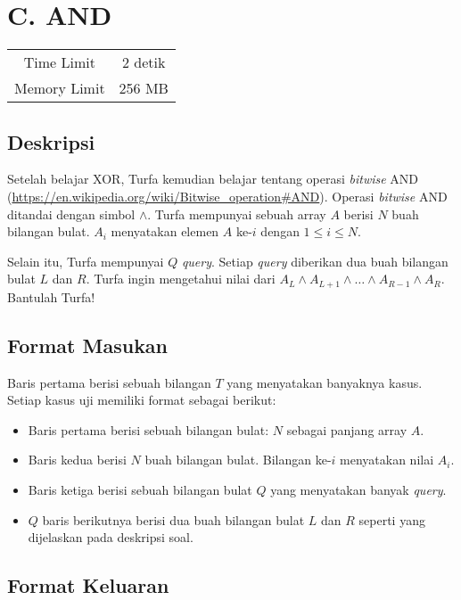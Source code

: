 \documentclass{article}
\begin{document}
\section*{\hfil C. AND\hfil}

\begin{center}
\begin{tabular}{ |cc| } 
 \hline
 Time Limit & 2 detik \\ 
 Memory Limit & 256 MB \\
 \hline
\end{tabular}
\end{center}

\subsection*{Deskripsi}
\par Setelah belajar XOR, Turfa kemudian belajar tentang operasi \textit{bitwise} AND (\url{https://en.wikipedia.org/wiki/Bitwise_operation#AND}). Operasi \textit{bitwise} AND ditandai dengan simbol $\land$. Turfa mempunyai sebuah array $A$ berisi $N$ buah bilangan bulat. $A_{i}$ menyatakan elemen $A$ ke-$i$ dengan $1 \leq i \leq N$.
\par\noindent Selain itu, Turfa mempunyai $Q$ \textit{query}. Setiap \textit{query} diberikan dua buah bilangan bulat $L$ dan $R$. Turfa ingin mengetahui nilai dari $A_{L} \land A_{L+1} \land \dots \land A_{R-1} \land A_{R}$. Bantulah Turfa!

\subsection*{Format Masukan}
\par Baris pertama berisi sebuah bilangan $T$ yang menyatakan banyaknya kasus. Setiap kasus uji memiliki format sebagai berikut:
\begin{itemize}
\item Baris pertama berisi sebuah bilangan bulat: $N$ sebagai panjang array $A$.
\item Baris kedua berisi $N$ buah bilangan bulat. Bilangan ke-$i$ menyatakan nilai $A_{i}$.
\item Baris ketiga berisi sebuah bilangan bulat $Q$ yang menyatakan banyak \textit{query}.
\item $Q$ baris berikutnya berisi dua buah bilangan bulat $L$ dan $R$ seperti yang dijelaskan pada deskripsi soal.
\end{itemize}

\subsection*{Format Keluaran}
\end{document}
